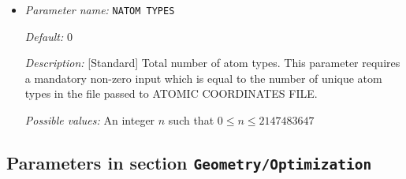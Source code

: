 \begin{itemize}
{\it Possible values:} An integer $n$ such that $0\leq n \leq 2147483647$
\item {\it Parameter name:} {\tt NATOM TYPES}
\label{parameters:Geometry/NATOM TYPES}
\label{parameters:Geometry/NATOM_20TYPES}




{\it Default:} 0


{\it Description:} [Standard] Total number of atom types. This parameter requires a mandatory non-zero input which is equal to the number of unique atom types in the file passed to ATOMIC COORDINATES FILE.


{\it Possible values:} An integer $n$ such that $0\leq n \leq 2147483647$
\end{itemize}



\subsection{Parameters in section \tt Geometry/Optimization}
\label{parameters:Geometry/Optimization}

